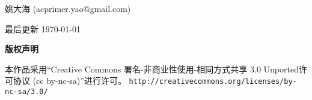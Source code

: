 \thispagestyle{plain}
\begin{center}
	{\LARGE\textbf{\BookTitle}}
	
	\vspace{1em}
	{\large 姚大海 (acprimer.yao@gmail.com)}
	
	\vspace{1ex}
	
	\vspace{1ex}
	最后更新 \today
	
	\vspace{1em}
	\textbf{\large 版权声明}
\end{center}
\noindent 本作品采用“Creative Commons 署名-非商业性使用-相同方式共享 3.0 Unported许可协议 
(cc by-nc-sa)”进行许可。
\texttt{\small http://creativecommons.org/licenses/by-nc-sa/3.0/}

\vspace{1em}
